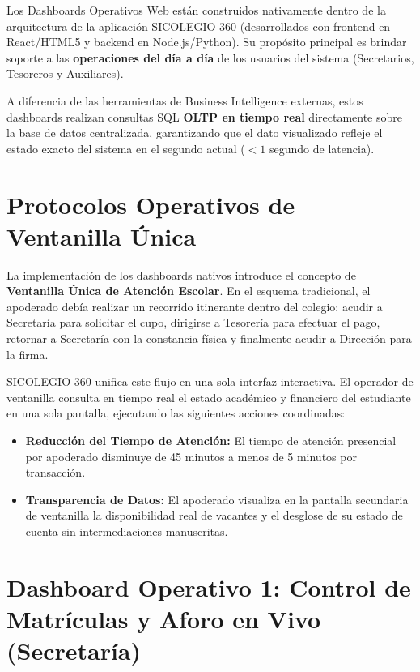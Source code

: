 \documentclass[12pt,a4paper,oneside]{report}
\begin{document}
    Los Dashboards Operativos Web están construidos nativamente dentro de la arquitectura de la aplicación SICOLEGIO 360 (desarrollados con frontend en React/HTML5 y backend en Node.js/Python). Su propósito principal es brindar soporte a las \textbf{operaciones del día a día} de los usuarios del sistema (Secretarios, Tesoreros y Auxiliares).

    A diferencia de las herramientas de Business Intelligence externas, estos dashboards realizan consultas SQL \textbf{OLTP en tiempo real} directamente sobre la base de datos centralizada, garantizando que el dato visualizado refleje el estado exacto del sistema en el segundo actual ($<1$ segundo de latencia).

    \section{Protocolos Operativos de Ventanilla Única}

    La implementación de los dashboards nativos introduce el concepto de \textbf{Ventanilla Única de Atención Escolar}. En el esquema tradicional, el apoderado debía realizar un recorrido itinerante dentro del colegio: acudir a Secretaría para solicitar el cupo, dirigirse a Tesorería para efectuar el pago, retornar a Secretaría con la constancia física y finalmente acudir a Dirección para la firma.

    SICOLEGIO 360 unifica este flujo en una sola interfaz interactiva. El operador de ventanilla consulta en tiempo real el estado académico y financiero del estudiante en una sola pantalla, ejecutando las siguientes acciones coordinadas:
    \begin{itemize}
        \item \textbf{Reducción del Tiempo de Atención:} El tiempo de atención presencial por apoderado disminuye de 45 minutos a menos de 5 minutos por transacción.
        \item \textbf{Transparencia de Datos:} El apoderado visualiza en la pantalla secundaria de ventanilla la disponibilidad real de vacantes y el desglose de su estado de cuenta sin intermediaciones manuscritas.
    \end{itemize}

    \section{Dashboard Operativo 1: Control de Matrículas y Aforo en Vivo (Secretaría)}
\end{document}
